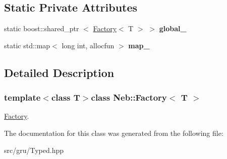 \subsection*{\-Static \-Private \-Attributes}
\begin{DoxyCompactItemize}
\item 
\hypertarget{classNeb_1_1Factory_a5dfcb071e1eb6d958542dbf8cc78a475}{static boost\-::shared\-\_\-ptr\*
$<$ \hyperlink{classNeb_1_1Factory}{\-Factory}$<$ \-T $>$ $>$ {\bfseries global\-\_\-}}\label{classNeb_1_1Factory_a5dfcb071e1eb6d958542dbf8cc78a475}

\item 
\hypertarget{classNeb_1_1Factory_ab44e98845974965837852826a710ad2e}{static std\-::map$<$ long int, \*
allocfun $>$ {\bfseries map\-\_\-}}\label{classNeb_1_1Factory_ab44e98845974965837852826a710ad2e}

\end{DoxyCompactItemize}


\subsection{\-Detailed \-Description}
\subsubsection*{template$<$class T$>$class Neb\-::\-Factory$<$ T $>$}

\hyperlink{classNeb_1_1Factory}{\-Factory}. 

\-The documentation for this class was generated from the following file\-:\begin{DoxyCompactItemize}
\item 
src/gru/\-Typed.\-hpp\end{DoxyCompactItemize}
